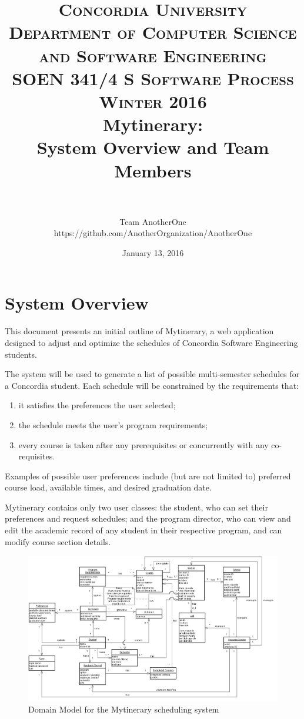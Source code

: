 \documentclass[paper=a4, fontsize=11pt, oneside]{scrartcl} %
\title{	
\normalfont \normalsize 
\textsc{Concordia University} \\
\textsc{Department of Computer Science and Software Engineering} \\
\textsc{SOEN 341/4 S \qquad Software Process \qquad Winter 2016} %
\horrule{0.5pt} \\[0.4cm] %
\huge Mytinerary: \\ System Overview and Team Members \\ %
\horrule{2pt} \\[0.5cm] %
}
\author{Team AnotherOne\\https://github.com/AnotherOrganization/AnotherOne} %
\date{\normalsize January 13, 2016} %
\begin{document}
\maketitle %


\section*{System Overview}
This document presents an initial outline of Mytinerary, a web application designed to adjust and optimize the schedules of Concordia Software Engineering students.

The system will be used to generate a list of possible multi-semester schedules for a Concordia student. Each schedule will be constrained by the requirements that:
\begin{enumerate}[label={\arabic*)}]
\item it satisfies the preferences the user selected;
\item the schedule meets the user's program requirements; 
\item every course is taken after any prerequisites or concurrently with any co-requisites. 
\end{enumerate}
Examples of possible user preferences include (but are not limited to) preferred course load, available times, and desired graduation date.

Mytinerary contains only two user classes: the student, who can set their preferences and request schedules; and the program director, who can view and edit the academic record of any student in their respective program, and can modify course section details.

\begin{figure}[H]
\centering
\includegraphics[width=1.4\textwidth, angle=-90]{domain_model}
\caption{Domain Model for the Mytinerary scheduling system}
\label{fig:domain_model}
\end{figure}
\end{document}
